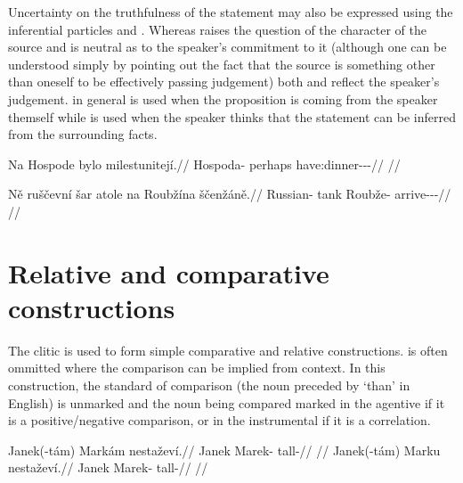 Uncertainty on the truthfulness of the statement may also be expressed using the inferential particles  and . Whereas  raises the question of the character of the source and is neutral as to the speaker’s commitment to it (although one can be understood simply by pointing out the fact that the source is something other than oneself to be effectively passing judgement) both  and  reflect the speaker’s judgement.  in general is used when the proposition is coming from the speaker themself while  is used when the speaker thinks that the statement can be inferred from the surrounding facts.

\pex
\begingl
  \gla Na Hospode bylo milestunitejí.//
  \glb \Loc{} Hospoda-\Acc{} perhaps have:dinner-\Lv{}-\SupP{}-\Quot{}//
  \glft {}//
\endgl
\xe

\pex
\begingl
  \gla Ně ruščevní šar atole na Roubžína ščenžáně.//
  \glb \Pl{} Russian-\Att{} tank \Infer{} \Loc{} Roubže-\Acc{} arrive-\Av{}-\Ret{}-\Quot{}//
  \glft {}//
\endgl
\xe











\section{Relative and comparative constructions}\label{relativecomparative}

The clitic  is used to form simple comparative and relative constructions.  is often ommitted where the comparison can be implied from context. In this construction, the standard of comparison (the noun preceded by `than' in English) is unmarked and the noun being compared marked in the agentive if it is a positive/negative comparison, or in the instrumental if it is a correlation.


\pex
\a\begingl
\gla Janek(-tám) Markám nestaževí.//
\glb Janek Marek-\Agt{} tall-//
\glft {}//
\endgl
\a\begingl
\gla Janek(-tám) Marku nestaževí.//
\glb Janek Marek-\Ins{} tall-//
\glft {}//
\endgl
\xe

